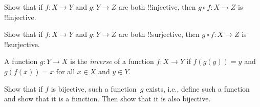 \documentclass[../../include/open-logic-section]{subfiles}
\begin{document}
\begin{prob}
Show that if $f \colon X \to Y$ and $g \colon Y \to Z$ are both
!!{injective}, then $g \circ f \colon X \to Z$ is !!{injective}.
\end{prob}

\begin{prob}
Show that if $f \colon X \to Y$ and $g \colon Y \to Z$ are both
!!{surjective}, then $g \circ f \colon X \to Z$ is !!{surjective}.
\end{prob}

\begin{prob}
A function $g \colon Y \to X$ is the \emph{inverse} of a function $f
\colon X \to Y$ if $f(g(y)) = y$ and $g(f(x)) = x$ for all $x \in X$
and $y \in Y$.

Show that if $f$ is bijective, such a function~$g$ exists, i.e.,
define such a function and show that it is a function. Then show that
it is also bijective.
\end{prob}
\end{document}
